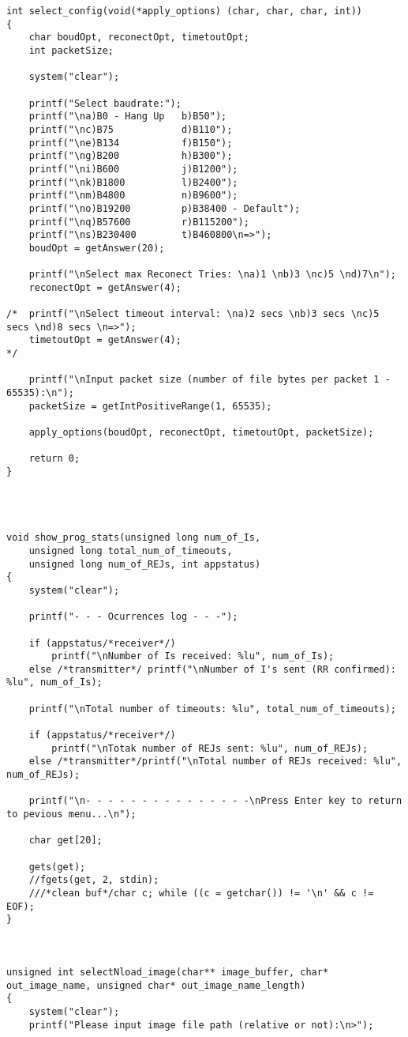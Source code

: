 \begin{lstlisting}
int select_config(void(*apply_options) (char, char, char, int))
{
	char boudOpt, reconectOpt, timetoutOpt;
	int packetSize;

	system("clear");

	printf("Select baudrate:");
	printf("\na)B0 - Hang Up   b)B50");
	printf("\nc)B75            d)B110");
	printf("\ne)B134           f)B150");
	printf("\ng)B200           h)B300");
	printf("\ni)B600           j)B1200");
	printf("\nk)B1800          l)B2400");
	printf("\nm)B4800          n)B9600");
	printf("\no)B19200         p)B38400 - Default");
	printf("\nq)B57600         r)B115200");
	printf("\ns)B230400        t)B460800\n=>");
	boudOpt = getAnswer(20);

	printf("\nSelect max Reconect Tries: \na)1 \nb)3 \nc)5 \nd)7\n");
	reconectOpt = getAnswer(4);

/*	printf("\nSelect timeout interval: \na)2 secs \nb)3 secs \nc)5 secs \nd)8 secs \n=>");
	timetoutOpt = getAnswer(4);
*/

	printf("\nInput packet size (number of file bytes per packet 1 - 65535):\n");
	packetSize = getIntPositiveRange(1, 65535);

	apply_options(boudOpt, reconectOpt, timetoutOpt, packetSize);

	return 0;
}




void show_prog_stats(unsigned long num_of_Is,
	unsigned long total_num_of_timeouts,
	unsigned long num_of_REJs, int appstatus)
{
	system("clear");

	printf("- - - Ocurrences log - - -");

	if (appstatus/*receiver*/)
		printf("\nNumber of Is received: %lu", num_of_Is);
	else /*transmitter*/ printf("\nNumber of I's sent (RR confirmed): %lu", num_of_Is);

	printf("\nTotal number of timeouts: %lu", total_num_of_timeouts);

	if (appstatus/*receiver*/)
		printf("\nTotak number of REJs sent: %lu", num_of_REJs);
	else /*transmitter*/printf("\nTotal number of REJs received: %lu", num_of_REJs);

	printf("\n- - - - - - - - - - - - - - -\nPress Enter key to return to pevious menu...\n");

	char get[20];

	gets(get);
	//fgets(get, 2, stdin); 
	///*clean buf*/char c; while ((c = getchar()) != '\n' && c != EOF);
}



unsigned int selectNload_image(char** image_buffer, char* out_image_name, unsigned char* out_image_name_length)
{
	system("clear");
	printf("Please input image file path (relative or not):\n>");


\end{lstlisting}
